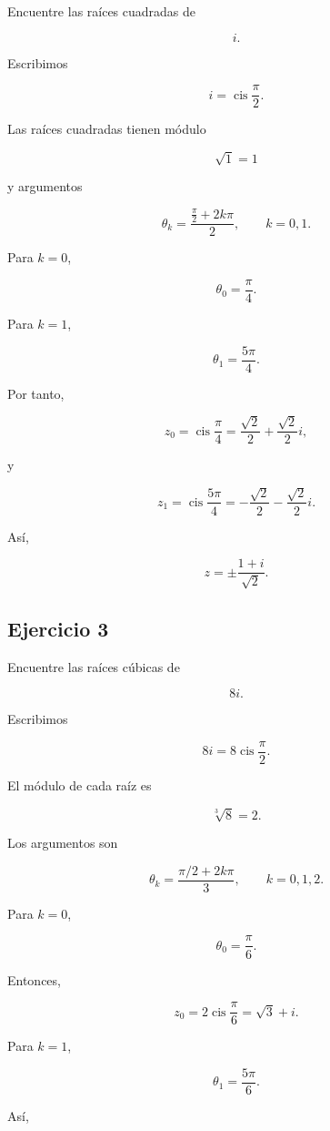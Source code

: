 \documentclass[12pt]{article}
\begin{document}
Encuentre las raíces cuadradas de

\[
i.
\]

Escribimos

\[
i
=
\operatorname{cis}\frac{\pi}{2}.
\]

Las raíces cuadradas tienen módulo

\[
\sqrt{1}=1
\]

y argumentos

\[
\theta_k
=
\frac{\frac{\pi}{2}+2k\pi}{2},
\qquad
k=0,1.
\]

Para \(k=0\),

\[
\theta_0=\frac{\pi}{4}.
\]

Para \(k=1\),

\[
\theta_1
=
\frac{5\pi}{4}.
\]

Por tanto,

\[
z_0
=
\operatorname{cis}\frac{\pi}{4}
=
\frac{\sqrt2}{2}
+
\frac{\sqrt2}{2}i,
\]

y

\[
z_1
=
\operatorname{cis}\frac{5\pi}{4}
=
-\frac{\sqrt2}{2}
-
\frac{\sqrt2}{2}i.
\]

Así,

\[
\boxed{
z=
\pm\frac{1+i}{\sqrt2}
}.
\]


\subsection*{Ejercicio 3}

Encuentre las raíces cúbicas de

\[
8i.
\]

Escribimos

\[
8i
=
8\operatorname{cis}\frac{\pi}{2}.
\]

El módulo de cada raíz es

\[
\sqrt[3]{8}=2.
\]

Los argumentos son

\[
\theta_k
=
\frac{\pi/2+2k\pi}{3},
\qquad
k=0,1,2.
\]

Para \(k=0\),

\[
\theta_0=\frac{\pi}{6}.
\]

Entonces,

\[
z_0
=
2\operatorname{cis}\frac{\pi}{6}
=
\sqrt3+i.
\]

Para \(k=1\),

\[
\theta_1
=
\frac{5\pi}{6}.
\]

Así,
\end{document}
